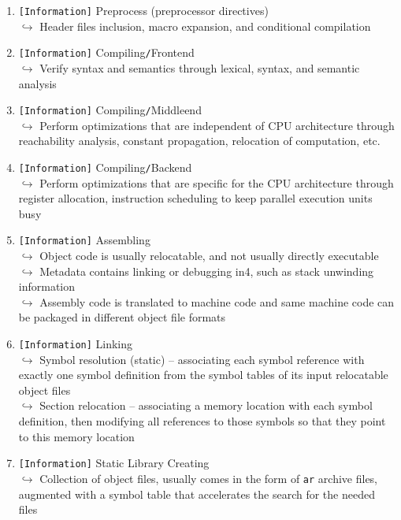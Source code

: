 \documentclass[main.tex]{subfiles}
\begin{document}
\begin{minipage}[t]{0.49\textwidth}
	\setlength{\parskip}{1em}
	\begin{enumerate}
		\item[\texttt{[\_]}] \texttt{[Information]} Preprocess (preprocessor directives)\\
		$\hookrightarrow$ Header files inclusion, macro expansion, and conditional compilation
		\item[\texttt{[\_]}] \texttt{[Information]} Compiling\texttt{/}Frontend\\
		$\hookrightarrow$ Verify syntax and semantics through lexical, syntax, and semantic analysis
		\item[\texttt{[\_]}] \texttt{[Information]} Compiling\texttt{/}Middleend\\
		$\hookrightarrow$ Perform optimizations that are independent of CPU architecture through reachability analysis, constant propagation, relocation of computation, etc.
		\item[\texttt{[\_]}] \texttt{[Information]} Compiling\texttt{/}Backend\\
		$\hookrightarrow$ Perform optimizations that are specific for the CPU architecture through register allocation, instruction scheduling to keep parallel execution units busy
		\item[\texttt{[\_]}] \texttt{[Information]} Assembling\\
		$\hookrightarrow$ Object code is usually relocatable, and not usually directly executable\\
		$\hookrightarrow$ Metadata contains linking or debugging in4, such as stack unwinding information\\
		$\hookrightarrow$ Assembly code is translated to machine code and same machine code can be packaged in different object file formats
		\item[\texttt{[\_]}] \texttt{[Information]} Linking\\
		$\hookrightarrow$ Symbol resolution (static) -- associating each symbol reference with exactly one symbol definition from the symbol tables of its input relocatable object files\\
		$\hookrightarrow$ Section relocation -- associating a memory location with each symbol definition, then modifying all references to those symbols so that they point to this memory location
		\item[\texttt{[\_]}] \texttt{[Information]} Static Library Creating\\
		$\hookrightarrow$ Collection of object files, usually comes in the form of \texttt{ar} archive files, augmented with a symbol table that accelerates the search for the needed files\\

\end{enumerate}
\end{minipage}
\end{document}
